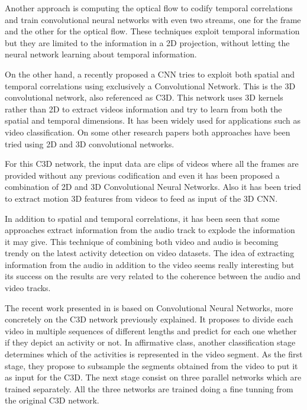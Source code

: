 Another approach is computing the optical flow to codify temporal correlations and train convolutional neural networks\cite{simonyan2014two}\cite{Ng_2015_CVPR} with even two streams\cite{wang2015towards}, one for the frame and the other for the optical flow. These techniques exploit temporal information but they are limited to the information in a 2D projection, without letting the neural network learning about temporal information.

On the other hand, a recently proposed a CNN tries to exploit both spatial and temporal correlations using exclusively a Convolutional Network. This is the 3D convolutional network, also referenced as C3D\cite{tran2014learning}. This network uses 3D kernels rather than 2D to extract videos information and try to learn from both the spatial and temporal dimensions. It has been widely used\cite{baccouche2011sequential}\cite{tran2015deep}\cite{tran2014learning}\cite{shoutemporal} for applications such as video classification. On some other research papers\cite{yao2015describing}\cite{zhang2016modelling} both approaches have been tried using 2D and 3D convolutional networks.

For this C3D network, the input data are clips of videos where all the frames are provided without any previous codification and even it has been proposed a combination of 2D and 3D Convolutional Neural Networks\cite{Ng_2015_CVPR}\cite{yao2015describing}. Also it has been tried to extract motion 3D features from videos to feed as input of the 3D CNN\cite{yao2015describing}.

In addition to spatial and temporal correlations, it has been seen that some approaches extract information from the audio track to explode the information it may give. This technique of combining both video and audio is becoming trendy on the latest activity detection on video datasets\cite{xu2015uts}. The idea of extracting information from the audio in addition to the video seems really interesting but its success on the results are very related to the coherence between the audio and video tracks.

The recent work presented in \cite{shoutemporal} is based on Convolutional Neural Networks, more concretely on the C3D network previously explained. It proposes to divide each video in multiple sequences of different lengths and predict for each one whether if they depict an activity or not. In affirmative class, another classification stage determines which of the activities is represented in the video segment. As the first stage, they propose to subsample the segments obtained from the video to put it as input for the C3D. The next stage consist on three parallel networks which are trained separately. All the three networks are trained doing a fine tunning from the original C3D network\cite{tran2014learning}.


